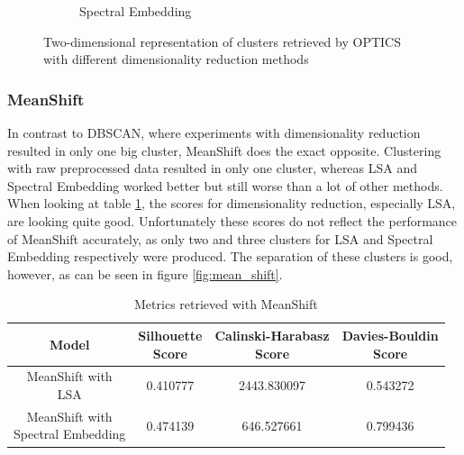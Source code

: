 \begin{figure}
\begin{subfigure}{.3\textwidth}
    \caption{Spectral Embedding}
    \label{fig:optics_spectral}
  \end{subfigure}
  \caption{Two-dimensional representation of clusters retrieved by OPTICS with different dimensionality reduction methods}
  \label{fig:optics}
\end{figure}

\subsubsection{MeanShift}

In contrast to DBSCAN, where experiments with dimensionality reduction resulted in only one big cluster, MeanShift does the exact opposite. Clustering with raw preprocessed data resulted in only one cluster, whereas LSA and Spectral Embedding worked better but still worse than a lot of other methods.
When looking at table \ref{tab:scores_mean_shift}, the scores for dimensionality reduction, especially LSA, are looking quite good. Unfortunately these scores do not reflect the performance of MeanShift accurately, as only two and three clusters for LSA and Spectral Embedding respectively were produced. The separation of these clusters is good, however, as can be seen in figure \ref{fig:mean_shift}.  

\begin{table}[]
  \centering
  \begin{tabular}{c|c|c|c}
    Model &  \shortstack[c]{Silhouette \\ Score} & \shortstack[c]{Calinski-Harabasz \\ Score} &  \shortstack[c]{Davies-Bouldin \\ Score}  \\
    \hline
    \hline
    \shortstack[c]{MeanShift with \\ LSA} & 0.410777 & 2443.830097 & 0.543272 \\
    \hline
    \shortstack[c]{MeanShift with \\ Spectral Embedding} & 0.474139 & 646.527661 & 0.799436 \\
   \end{tabular}
  \caption{Metrics retrieved with MeanShift}
  \label{tab:scores_mean_shift}
\end{table}

